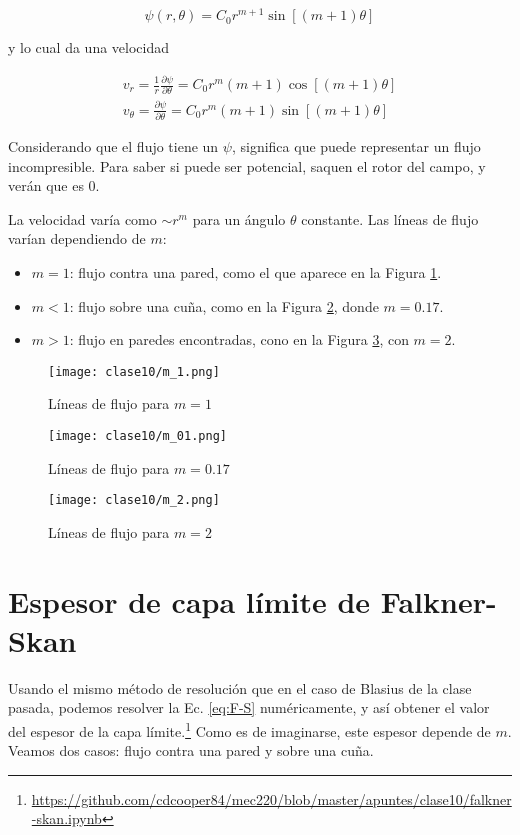 \begin{equation}
\psi(r,\theta) = C_0 r^{m+1}\sin\left[(m+1)\theta\right]
\end{equation}

y lo cual da una velocidad

\begin{align}
v_r = \frac{1}{r}\frac{\partial\psi}{\partial\theta} = C_0 r^m(m+1)\cos[(m+1)\theta] \nonumber\\
v_\theta = \frac{\partial\psi}{\partial\theta} = C_0 r^m(m+1)\sin[(m+1)\theta]
\end{align}

Considerando que el flujo tiene un $\psi$, significa que puede representar un flujo incompresible.
Para saber si puede ser potencial, saquen el rotor del campo, y verán que es $0$.

La velocidad varía como $\sim r^m$ para un ángulo $\theta$ constante. 
Las líneas de flujo varían dependiendo de $m$:
%
\begin{itemize}
\item $m=1$: flujo contra una pared, como el que aparece en la Figura \ref{fig:m_1}.
\item $m<1$: flujo sobre una cuña, como en la Figura \ref{fig:m_01}, donde $m=0.17$.
\item $m>1$: flujo en paredes encontradas, cono en la Figura \ref{fig:m_2}, con $m=2$.
\end{itemize}

\begin{figure}
\centering
\texttt{[image: clase10/m\_1.png]}
\caption{Líneas de flujo para $m=1$}
\label{fig:m_1}
\end{figure}
%
\begin{figure}
\centering
\texttt{[image: clase10/m\_01.png]}
\caption{Líneas de flujo para $m=0.17$}
\label{fig:m_01}
\end{figure}
%
\begin{figure}
\centering
\texttt{[image: clase10/m\_2.png]}
\caption{Líneas de flujo para $m=2$}
\label{fig:m_2}
\end{figure}

\section*{Espesor de capa límite de Falkner-Skan}
Usando el mismo método de resolución que en el caso de Blasius de la clase pasada, podemos resolver la Ec. \eqref{eq:F-S} numéricamente, y así obtener el valor del espesor de la capa límite.\footnote{\url{https://github.com/cdcooper84/mec220/blob/master/apuntes/clase10/falkner-skan.ipynb}}
Como es de imaginarse, este espesor depende de $m$.
Veamos dos casos: flujo contra una pared y sobre una cuña.


